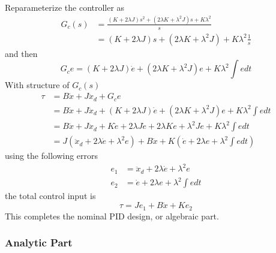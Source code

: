 Reparameterize the controller as
\begin{align*}
  G_{c}(s)&=\frac{(K+2\lambda J)s^{2}+(2\lambda K+\lambda^{2}J)s+K\lambda^{2}}{s} \\
  &=(K+2\lambda J)s+(2\lambda K+\lambda^{2}J)+K\lambda^{2}\frac{1}{s}
\end{align*}
and then
\begin{equation*}
  G_{c}e=(K+2\lambda J)\dot{e}+(2\lambda K+\lambda^{2}J)e+K\lambda^{2}\int edt
\end{equation*}
With structure of $G_{c}(s)$
\begin{align*}
  \tau&=B\dot{x}+J\ddot{x}_{d}+G_{c}e \\
  &=B\dot{x}+J\ddot{x}_{d}+(K+2\lambda J)\dot{e}+(2\lambda K+\lambda^{2}J)e+K\lambda^{2}\int edt \\
  &=B\dot{x}+J\ddot{x}_{d}+K\dot{e}+2\lambda J\dot{e}+2\lambda Ke+\lambda^{2}Je+K\lambda^{2}\int edt \\
  &=J(\ddot{x}_{d}+2\lambda\dot{e}+\lambda^{2}e)+B\dot{x}+K\left(\dot{e}+2\lambda e+\lambda^{2}\int edt\right)
\end{align*}
using the following errors
\begin{align*}
  e_{1}&=\ddot{x}_{d}+2\lambda\dot{e}+\lambda^{2}e \\
  e_{2}&=\dot{e}+2\lambda e+\lambda^{2}\int e dt
\end{align*}
the total control input is
\begin{equation*}
  \tau=Je_{1}+B\dot{x}+Ke_{2}
\end{equation*}
This completes the nominal PID design, or algebraic part.

\subsubsection{Analytic Part}

